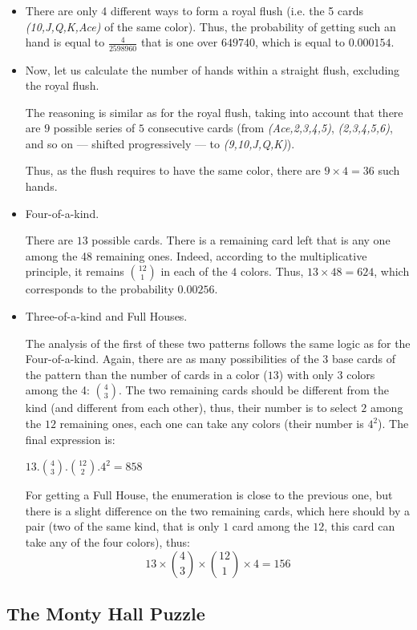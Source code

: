 \begin{itemize}
\item
There are only 4 different ways to form a royal flush (i.e. the 5 cards  \textit{(10,J,Q,K,Ace)} of the same color). 
Thus, the probability of getting such an hand is equal to $\frac{4}{2 598 960}$ that is one over $649740$, which is equal to $0.000154$.
\item
Now, let us calculate the number of hands within a straight flush, excluding the royal flush.

The reasoning is similar as for the royal flush, taking into account that there are $9$ possible series of $5$ consecutive cards
(from \textit{(Ace,2,3,4,5)}, \textit{(2,3,4,5,6)}, and so on --- shifted progressively --- to \textit{(9,10,J,Q,K)}).

Thus, as the flush requires to have the same color, there are $9 \times 4 = 36$ such hands. 
\item
Four-of-a-kind.

There are $13$ possible cards. There is a remaining card left that is any one among the 48 remaining ones.
Indeed, according to the multiplicative principle, it remains ${12 \choose 1}$ in each of the $4$ colors. 
Thus, $13 \times 48 = 624$, which corresponds to the probability $0.00256$.
\item
Three-of-a-kind and Full Houses.

The analysis of the first of these two patterns follows the same logic as for the Four-of-a-kind.
Again, there are as many possibilities of the $3$ base cards of the pattern than the number of cards in a color ($13$)
with only $3$ colors among the 4: ${4 \choose 3}$.
The two remaining cards should be different from the kind (and different from each other), 
thus, their number is to select $2$ among the $12$ remaining ones,
each one can take any colors (their number is $4^2$).
The final expression is:

$13.{4 \choose 3}.{12 \choose 2}.4^2 = 858$

For getting a Full House, the enumeration is close to the previous one, but there is a slight difference 
on the two remaining cards,
which here should by a pair (two of the same kind, that is only $1$ card among the $12$, 
this card can take any of the four colors),
thus:
\[ 13 \times {4 \choose 3} \times {12 \choose 1} \times 4 = 156 \]
\end{itemize}


\subsection{The Monty Hall Puzzle}
\label{sec:monty-hall}

